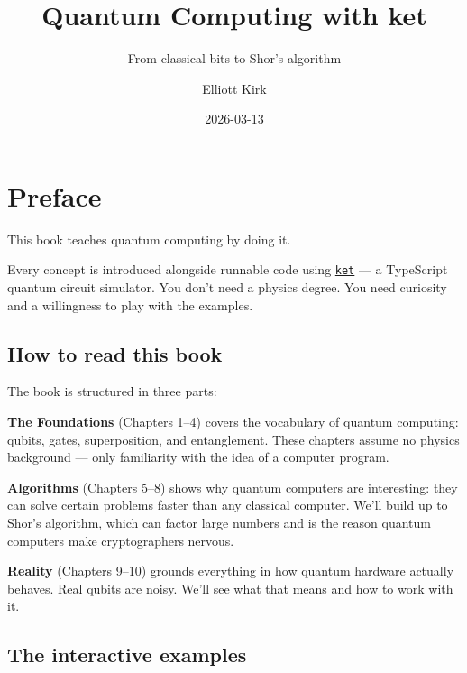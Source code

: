 \documentclass[
  11pt,
  letterpaper,
  oneside]{scrbook}
\title{Quantum Computing with ket}
\subtitle{From classical bits to Shor's algorithm}
\author{Elliott Kirk}
\date{2026-03-13}
\renewcommand*\contentsname{Table of contents}
\newcommand\contentsname{Table of contents}
\begin{document}
\frontmatter
\maketitle

\renewcommand*\contentsname{Table of contents}
{
\setcounter{tocdepth}{2}
\tableofcontents
}

\mainmatter
{}

\chapter*{Preface}\label{preface}


This book teaches quantum computing by doing it.

Every concept is introduced alongside runnable code using
\href{https://github.com/dmvjs/ket}{\texttt{ket}} --- a TypeScript
quantum circuit simulator. You don't need a physics degree. You need
curiosity and a willingness to play with the examples.

\section*{How to read this book}\label{how-to-read-this-book}


The book is structured in three parts:

\textbf{The Foundations} (Chapters 1--4) covers the vocabulary of
quantum computing: qubits, gates, superposition, and entanglement. These
chapters assume no physics background --- only familiarity with the idea
of a computer program.

\textbf{Algorithms} (Chapters 5--8) shows why quantum computers are
interesting: they can solve certain problems faster than any classical
computer. We'll build up to Shor's algorithm, which can factor large
numbers and is the reason quantum computers make cryptographers nervous.

\textbf{Reality} (Chapters 9--10) grounds everything in how quantum
hardware actually behaves. Real qubits are noisy. We'll see what that
means and how to work with it.

\section*{The interactive examples}\label{the-interactive-examples}
\end{document}
